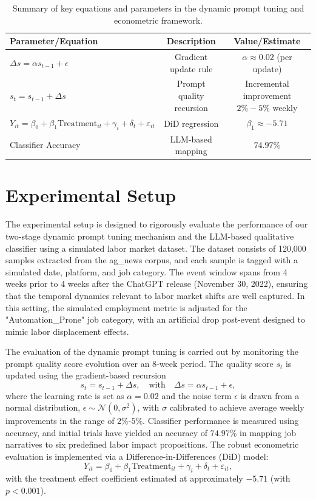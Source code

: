 \documentclass{article}
\begin{document}
\begin{table}[h]
\centering
\begin{tabular}{lcc}
\hline
\textbf{Parameter/Equation} & \textbf{Description} & \textbf{Value/Estimate} \\
\hline
\( \Delta s = \alpha s_{t-1} + \epsilon \) & Gradient update rule & \(\alpha \approx 0.02\) (per update) \\
\( s_t = s_{t-1} + \Delta s \) & Prompt quality recursion & Incremental improvement \(2\%-5\%\) weekly \\
\( Y_{it} = \beta_0 + \beta_1 \text{Treatment}_{it} + \gamma_i + \delta_t + \varepsilon_{it} \) & DiD regression & \(\beta_1 \approx -5.71\) \\
Classifier Accuracy & LLM-based mapping & \(74.97\%\) \\
\hline
\end{tabular}
\caption{Summary of key equations and parameters in the dynamic prompt tuning and econometric framework.}
\label{tab:methods_summary}
\end{table}

\section{Experimental Setup}
The experimental setup is designed to rigorously evaluate the performance of our two-stage dynamic prompt tuning mechanism and the LLM-based qualitative classifier using a simulated labor market dataset. The dataset consists of 120,000 samples extracted from the ag\_news corpus, and each sample is tagged with a simulated date, platform, and job category. The event window spans from 4 weeks prior to 4 weeks after the ChatGPT release (November 30, 2022), ensuring that the temporal dynamics relevant to labor market shifts are well captured. In this setting, the simulated employment metric is adjusted for the "Automation\_Prone" job category, with an artificial drop post-event designed to mimic labor displacement effects.

The evaluation of the dynamic prompt tuning is carried out by monitoring the prompt quality score evolution over an 8-week period. The quality score \( s_t \) is updated using the gradient-based recursion
\[
s_t = s_{t-1} + \Delta s, \quad \text{with} \quad \Delta s = \alpha s_{t-1} + \epsilon,
\]
where the learning rate is set as \( \alpha = 0.02 \) and the noise term \( \epsilon \) is drawn from a normal distribution, \( \epsilon \sim \mathcal{N}(0, \sigma^2) \), with \(\sigma\) calibrated to achieve average weekly improvements in the range of \(2\%\)-\(5\%\). Classifier performance is measured using accuracy, and initial trials have yielded an accuracy of \(74.97\%\) in mapping job narratives to six predefined labor impact propositions. The robust econometric evaluation is implemented via a Difference-in-Differences (DiD) model:
\[
Y_{it} = \beta_0 + \beta_1 \text{Treatment}_{it} + \gamma_i + \delta_t + \varepsilon_{it},
\]
with the treatment effect coefficient estimated at approximately \(-5.71\) (with \( p < 0.001 \)).
\end{document}
